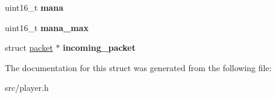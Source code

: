 \begin{DoxyCompactItemize}
\item 
\hypertarget{structplayer_a44e839b794a45c9ca2191ec4db7f14d7}{}uint16\+\_\+t {\bfseries mana}\label{structplayer_a44e839b794a45c9ca2191ec4db7f14d7}

\item 
\hypertarget{structplayer_a328cfef5700faf9b42a7e508a817c991}{}uint16\+\_\+t {\bfseries mana\+\_\+max}\label{structplayer_a328cfef5700faf9b42a7e508a817c991}

\item 
\hypertarget{structplayer_ad0cb5d486efe31d8d354fa220941f545}{}struct \hyperlink{structpacket}{packet} $\ast$ {\bfseries incoming\+\_\+packet}\label{structplayer_ad0cb5d486efe31d8d354fa220941f545}

\end{DoxyCompactItemize}


The documentation for this struct was generated from the following file\+:\begin{DoxyCompactItemize}
\item 
src/player.\+h\end{DoxyCompactItemize}
